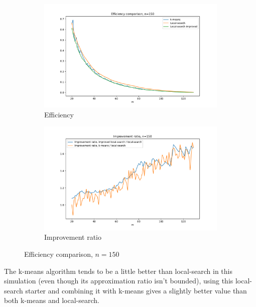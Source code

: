 \documentclass{amsart}
\begin{document}
\begin{figure}[ht]
    \centering
    \begin{subfigure}[b]{0.495\textwidth}
        \centering
        \includegraphics[width=1.1\textwidth]{plots/effiency cl.pdf}
        \caption{Efficiency}
    \end{subfigure}
    \hfill
    \begin{subfigure}[b]{0.495\textwidth}
        \centering
        \includegraphics[width=1.1\textwidth]{plots/efficiency ratio cl.pdf}
        \caption{Improvement ratio}
    \end{subfigure}
    \caption{Efficiency comparison, $n=150$}
    \label{cl }
\end{figure}


The k-means algorithm tends to be a little better than local-search in this simulation (even though its approximation ratio isn't bounded), using this local-search starter and combining it with k-means gives a slightly better value than both k-means and local-search.
\end{document}
